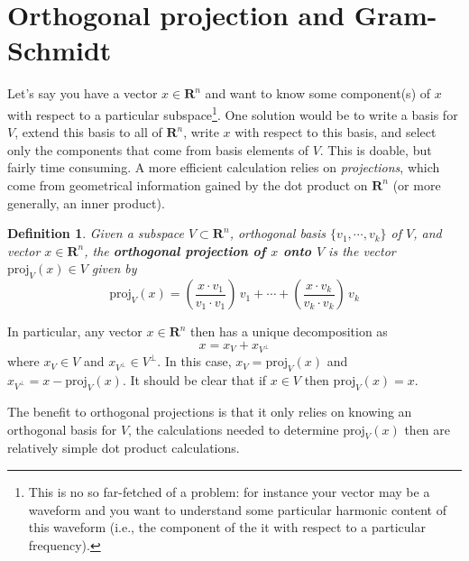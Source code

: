 \documentclass[12pt]{article}
\numberwithin{equation}{subsection}
\numberwithin{figure}{subsection}
\newtheorem{defn}[subsection]{Definition}
\theoremstyle{note}
\newcommand{\R}{\mathbf{R}}
\newcommand\proj[2]{\mathrm{proj}_{#1}(#2)}
\begin{document}
\section[Orthogonal projection]{Orthogonal projection and Gram-Schmidt}

Let's say you have a vector $x\in \R^n$ and want to know some component(s) of $x$ with respect to a particular subspace\footnote{This is no so far-fetched of a problem: for instance your vector may be a waveform and you want to understand some particular harmonic content of this waveform (i.e., the component of the it with respect to a particular frequency).}. One solution would be to write a basis for $V$, extend this basis to all of $\R^n$, write $x$ with respect to this basis, and select only the components that come from basis elements of $V$. This is doable, but fairly time consuming. A more efficient calculation relies on \textit{projections}, which come from geometrical information gained by the dot product on $\R^n$ (or more generally, an inner product). 



\begin{defn}
	Given a subspace $V\subset \R^n$, orthogonal basis $\{v_1,\cdots,v_k\}$ of $V$, and vector $x\in\R^n$, the \textbf{orthogonal projection of $x$ onto $V$} is the vector $\proj{V}{x}\in V$ given by \begin{equation}
		\proj{V}{x}=\left( \dfrac{x\cdot v_1}{v_1\cdot v_1}\right) \,v_1 + \cdots + \left( \dfrac{x\cdot v_k}{v_k\cdot v_k}\right) \,v_k
	\end{equation}
\end{defn}
	In particular, any vector $x\in \R^n$ then has a unique decomposition as \begin{equation} x=x_V+x_{V^{\perp}} \end{equation}  where $x_V\in V$ and $x_{V^{\perp}} \in V^{\perp}$. In this case, $x_V=\proj{V}{x}$ and $x_{V^{\perp}}=x-\proj{V}{x}$. It should be clear that if $x\in V$ then $\proj{V}{x}=x$. 
	
	The benefit to orthogonal projections is that it only relies on knowing an orthogonal basis for $V$, the calculations needed to determine $\proj{V}{x}$ then are relatively simple dot product calculations. 
	
\end{document}
